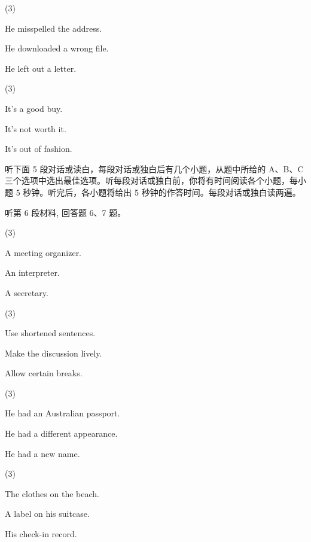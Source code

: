 \documentclass{英语试卷}
\begin{document}
\begin{choices}(3)
  \item He misspelled the address.
  \item He downloaded a wrong file.
  \item He left out a letter.
\end{choices}
\begin{choices}(3)
  \item It's a good buy.
  \item It's not worth it.
  \item It's out of fashion.
\end{choices}
\par 听下面 5 段对话或读白，每段对话或独白后有几个小题，从题中所给的 A、B、C 三个选项中选出最佳选项。听每段对话或独白前，你将有时间阅读各个小题，每小题 5 秒钟。听完后，各小题将给出 5 秒钟的作答时间。每段对话或独白读两遍。\par
\par 听第 6 段材料, 回答题 6、7 题。\par
{}
\begin{choices}(3)
  \item A meeting organizer.
  \item An interpreter.
  \item A secretary.
\end{choices}
\begin{choices}(3)
  \item Use shortened sentences.
  \item Make the discussion lively.
  \item Allow certain breaks.
\end{choices}
\begin{choices}(3)
  \item He had an Australian passport.
  \item He had a different appearance.
  \item He had a new name.
\end{choices}
\begin{choices}(3)
  \item The clothes on the beach.
  \item A label on his suitcase.
  \item His check-in record.
\end{choices}
\end{document}
